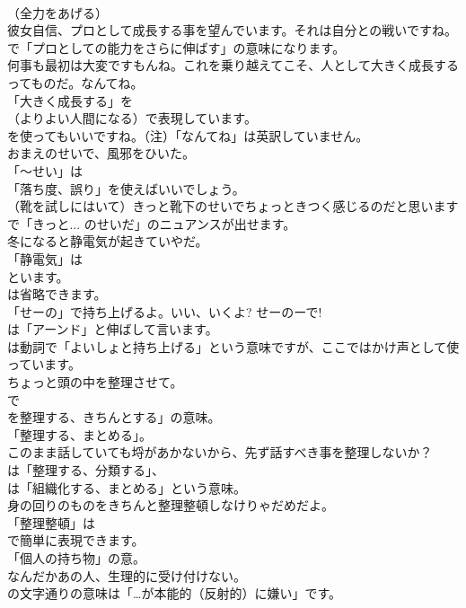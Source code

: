 \documentclass[8pt]{extreport}
\begin{document}
\begin{CJK}{UTF8}{min}
\\	（全力をあげる）	
\\	彼女自信、プロとして成長する事を望んでいます。それは自分との戦いですね。 
\\	で「プロとしての能力をさらに伸ばす」の意味になります。	
\\	何事も最初は大変ですもんね。これを乗り越えてこそ、人として大きく成長するってものだ。なんてね。 
\\	「大きく成長する」を 
\\	（よりよい人間になる）で表現しています。
\\	を使ってもいいですね。（注）「なんてね」は英訳していません。	
\\	おまえのせいで、風邪をひいた。 
\\	「～せい」は
\\	「落ち度、誤り」を使えばいいでしょう。	
\\	（靴を試しにはいて）きっと靴下のせいでちょっときつく感じるのだと思います 
\\	で「きっと... のせいだ」のニュアンスが出せます。	
\\	冬になると静電気が起きていやだ。 
\\	「静電気」は
\\	といます。
\\	は省略できます。	
\\	「せーの」で持ち上げるよ。いい、いくよ? せーのーで! 
\\	は「アーンド」と伸ばして言います。
\\	は動詞で「よいしょと持ち上げる」という意味ですが、ここではかけ声として使っています。	
\\	ちょっと頭の中を整理させて。 
\\	で
\\	を整理する、きちんとする」の意味。
\\	「整理する、まとめる」。	
\\	このまま話していても埒があかないから、先ず話すべき事を整理しないか？ 
\\	は「整理する、分類する」、
\\	は「組織化する、まとめる」という意味。	
\\	身の回りのものをきちんと整理整頓しなけりゃだめだよ。 
\\	「整理整頓」は
\\	で簡単に表現できます。
\\	「個人の持ち物」の意。	
\\	なんだかあの人、生理的に受け付けない。 
\\	の文字通りの意味は「…が本能的（反射的）に嫌い」です。	

\end{CJK}
\end{document}
